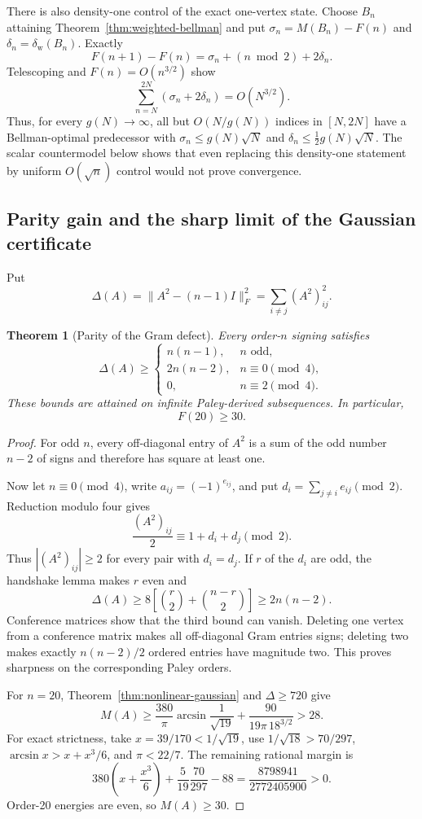 \documentclass[11pt]{article}
\newtheorem{theorem}{Theorem}
\begin{document}
There is also density-one control of the exact one-vertex state.  Choose
$B_n$ attaining Theorem~\ref{thm:weighted-bellman} and put
$\sigma_n=M(B_n)-F(n)$ and $\delta_n=\delta_{\mathrm w}(B_n)$.  Exactly
\[
 F(n+1)-F(n)=\sigma_n+(n\bmod2)+2\delta_n.
\]
Telescoping and $F(n)=O(n^{3/2})$ show
\[
 \sum_{n=N}^{2N}(\sigma_n+2\delta_n)=O(N^{3/2}).
\]
Thus, for every $g(N)\to\infty$, all but $O(N/g(N))$ indices in $[N,2N]$
have a Bellman-optimal predecessor with
$\sigma_n\le g(N)\sqrt N$ and
$\delta_n\le\frac12g(N)\sqrt N$.  The scalar countermodel below shows that
even replacing this density-one statement by uniform $O(\sqrt n)$ control
would not prove convergence.

\subsection{Parity gain and the sharp limit of the Gaussian certificate}

Put
\[
 \Delta(A)=\|A^2-(n-1)I\|_F^2
 =\sum_{i\ne j}(A^2)_{ij}^2.
\]

\begin{theorem}[Parity of the Gram defect]
\label{thm:parity-defect}
Every order-$n$ signing satisfies
\[
 \Delta(A)\ge
 \begin{cases}
 n(n-1),&n\text{ odd},\\
 2n(n-2),&n\equiv0\pmod4,\\
 0,&n\equiv2\pmod4.
 \end{cases}
\]
These bounds are attained on infinite Paley-derived subsequences.  In
particular,
\[
 \boxed{F(20)\ge30}.
\]
\end{theorem}

\begin{proof}
For odd $n$, every off-diagonal entry of $A^2$ is a sum of the odd number
$n-2$ of signs and therefore has square at least one.

Now let $n\equiv0\pmod4$, write $a_{ij}=(-1)^{e_{ij}}$, and put
$d_i=\sum_{j\ne i}e_{ij}\pmod2$.  Reduction modulo four gives
\[
 \frac{(A^2)_{ij}}2\equiv1+d_i+d_j\pmod2.
\]
Thus $|(A^2)_{ij}|\ge2$ for every pair with $d_i=d_j$.  If $r$ of the
$d_i$ are odd, the handshake lemma makes $r$ even and
\[
 \Delta(A)\ge
 8\left[\binom r2+\binom{n-r}2\right]\ge2n(n-2).
\]
Conference matrices show that the third bound can vanish.  Deleting one
vertex from a conference matrix makes all off-diagonal Gram entries signs;
deleting two makes exactly $n(n-2)/2$ ordered entries have magnitude two.
This proves sharpness on the corresponding Paley orders.

For $n=20$, Theorem~\ref{thm:nonlinear-gaussian} and
$\Delta\ge720$ give
\[
 M(A)\ge\frac{380}{\pi}\arcsin\frac1{\sqrt{19}}
 +\frac{90}{19\pi\,18^{3/2}}>28.
\]
For exact strictness, take $x=39/170<1/\sqrt{19}$, use
$1/\sqrt{18}>70/297$, $\arcsin x>x+x^3/6$, and $\pi<22/7$.  The
remaining rational margin is
\[
 380\left(x+\frac{x^3}{6}\right)
 +\frac5{19}\frac{70}{297}-88
 =\frac{8798941}{2772405900}>0.
\]
Order-20 energies are even, so $M(A)\ge30$.
\end{proof}
\end{document}
